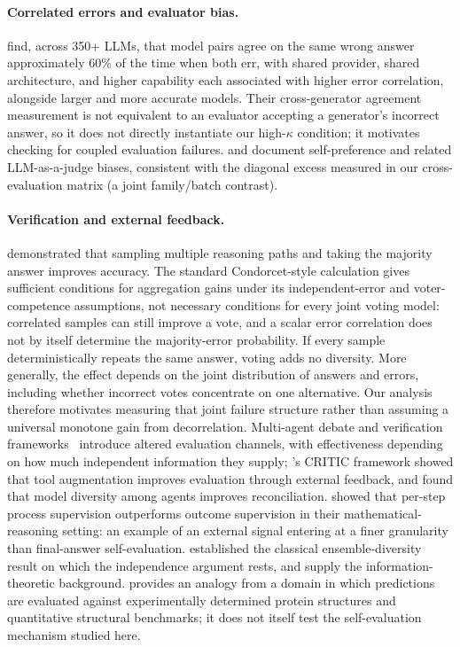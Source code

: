 \documentclass[a4paper,journal]{IAENGtran}
\begin{document}
\paragraph{Correlated errors and evaluator bias.} \cite{kim2025correlated} find,
across 350+ LLMs, that model pairs agree on the same wrong answer approximately 60\%
of the time when both err, with shared provider, shared architecture, and higher
capability each associated with higher error correlation, alongside larger and more
accurate models. Their cross-generator
agreement measurement is not equivalent to an evaluator accepting a generator's
incorrect answer, so it does not directly instantiate our high-$\kappa$ condition; it
motivates checking for coupled evaluation failures. \cite{wataoka2024selfpreference}
and \cite{li2024llmjudgebias} document self-preference and related LLM-as-a-judge
biases, consistent with the diagonal excess measured in our cross-evaluation
matrix (a joint family/batch contrast).

\paragraph{Verification and external feedback.} \cite{wang2023selfconsistency}
demonstrated that sampling multiple reasoning paths and taking the majority answer
improves accuracy. The standard Condorcet-style calculation gives sufficient conditions
for aggregation gains under its independent-error and voter-competence assumptions, not
necessary conditions for every joint voting model: correlated samples can still improve
a vote, and a scalar error correlation does not by itself determine the majority-error
probability. If every sample deterministically repeats the same answer, voting adds no
diversity. More generally, the effect depends on the joint distribution of answers and
errors, including whether incorrect votes concentrate on one alternative. Our analysis
therefore motivates measuring that joint failure structure rather than assuming a
universal monotone gain from decorrelation. Multi-agent debate and verification
frameworks~\cite{du2023debate, liang2023debate} introduce altered evaluation channels,
with effectiveness depending on how much independent information they supply;
\cite{gou2023critic}'s CRITIC framework showed that tool augmentation improves
evaluation through external feedback, and \cite{chen2024reconcile} found that model
diversity among agents improves reconciliation.
\cite{lightman2023process} showed that
per-step process supervision outperforms outcome supervision in their
mathematical-reasoning setting: an example of an external signal entering at a finer
granularity than final-answer self-evaluation.
\cite{krogh1995ensemble} established the classical ensemble-diversity result on which
the independence argument rests, and \cite{cover2006elements} supply the
information-theoretic background. \cite{alphafold} provides an analogy from a domain in which predictions are evaluated
against experimentally determined protein structures and quantitative structural
benchmarks; it does not itself test the self-evaluation mechanism studied here.
\end{document}
